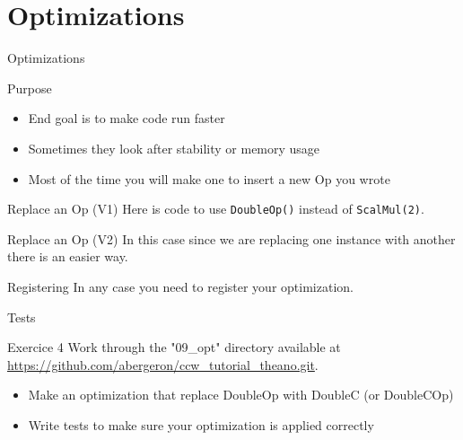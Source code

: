 \documentclass[utf8x]{beamer}
\newcommand{\code}[1]{\lstinline[emph={[2]}]|#1|}
\begin{document}
\section{Optimizations}

\begin{frame}[plain]{}
\begin{center}
\Huge Optimizations
\end{center}
\end{frame}

\begin{frame}{Purpose}
\begin{itemize}
\item End goal is to make code run faster
\item Sometimes they look after stability or memory usage
\item Most of the time you will make one to insert a new Op you wrote
\end{itemize}
\end{frame}

\begin{frame}{Replace an Op (V1)}
Here is code to use \code{DoubleOp()} instead of \code{ScalMul(2)}.

\end{frame}

\begin{frame}{Replace an Op (V2)}
In this case since we are replacing one instance with another there is an easier way.

\end{frame}

\begin{frame}{Registering}
In any case you need to register your optimization.


\end{frame}

\begin{frame}{Tests}

\end{frame}

\begin{frame}{Exercice 4}
Work through the "09\_opt" directory available at \url{https://github.com/abergeron/ccw_tutorial_theano.git}.
\begin{itemize}
\item Make an optimization that replace DoubleOp with DoubleC (or DoubleCOp)
\item Write tests to make sure your optimization is applied correctly
\end{itemize}
\end{frame}
\end{document}
